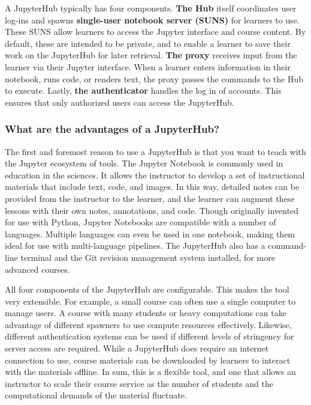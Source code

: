 A JupyterHub typically has four components. 
\textbf{The Hub} itself coordinates user log-ins and spawns \textbf{single-user notebook server (SUNS)} for learners to use.
These SUNS allow learners to access the Jupyter interface and course content.
By default, these are intended to be private, and to enable a learner to save their work on the JupyterHub for later retrieval. 
\textbf{The proxy} receives input from the learner via their Jupyter interface. 
When a learner enters information in their notebook, runs code, or renders text, the proxy passes the commands to the Hub to execute. 
Lastly, \textbf{the authenticator} handles the log in of accounts.
This ensures that only authorized users can access the JupyterHub. 

\subsubsection{What are the advantages of a JupyterHub?}

The first and foremost reason to use a JupyterHub is that you want to teach with the Jupyter ecosystem of tools.
The Jupyter Notebook is commonly used in education in the sciences.
It allows the instructor to develop a set of instructional materials that include text, code, and images.
In this way, detailed notes can be provided from the instructor to the learner, and the learner can augment these lessons with their own notes, annotations, and code.
Though originally invented for use with Python, Jupyter Notebooks are compatible with a number of languages.
Multiple languages can even be used in one notebook, making them ideal for use with multi-language pipelines.
The JupyterHub also has a command-line terminal and the Git revision management system installed, for more advanced courses.

All four components of the JupyterHub are configurable.
This makes the tool very extensible. 
For example, a small course can often use a single computer to manage users.
A course with many students or heavy computations can take advantage of different spawners to use compute resources effectively.
Likewise, different authentication systems can be used if different levels of stringency for server access are required.
While a JupyterHub does require an internet connection to use, course materials can be downloaded by learners to interact with the materials offline. 
In sum, this is a flexible tool, and one that allows an instructor to scale their course service as the number of students and the computational demands of the material fluctuate. 


